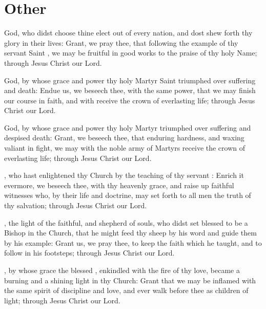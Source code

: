 \section{Other}

 God, who didst choose thine elect out of every nation, and dost shew forth thy glory in their lives: Grant, we pray thee, that following the example of thy servant Saint , we may be fruitful in good works to the praise of thy holy Name; through Jesus Christ our Lord.

 God, by whose grace and power thy holy Martyr Saint  triumphed over suffering and death: Endue us, we beseech thee, with the same power, that we may finish our course in faith, and with  receive the crown of everlasting life; through Jesus Christ our Lord.

 God, by whose grace and power thy holy Martyr  triumphed over suffering and despised death: Grant, we beseech thee, that enduring hardness, and waxing valiant in fight, we may with the noble army of Martyrs receive the crown of everlasting life; through Jesus Christ our Lord.

, who hast enlightened thy Church by the teaching of thy servant : Enrich it evermore, we beseech thee, with thy heavenly grace, and raise up faithful witnesses who, by their life and doctrine, may set forth to all men the truth of thy salvation; through Jesus Christ our Lord.

, the light of the faithful, and shepherd of souls, who didst set blessed  to be a Bishop in the Church, that he might feed thy sheep by his word and guide them by his example: Grant us, we pray thee, to keep the faith which he taught, and to follow in his footsteps; through Jesus Christ our Lord.

, by whose grace the blessed , enkindled with the fire of thy love, became a burning and a shining light in thy Church: Grant that we may be inflamed with the same spirit of discipline and love, and ever walk before thee as children of light; through Jesus Christ our Lord.

